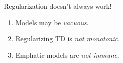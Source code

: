 \begin{mybox}
    {\headerfont Regularization doesn't always work!}
    \vspace{.5em}
    {\large
        \begin{enumerate}
            \item Models may be \emph{vacuous}.
            \item Regularizing TD is \emph{not monotonic}.
            \item Emphatic models are \emph{not immune}.
        \end{enumerate}
    }
    \vspace{.5em}
\end{mybox}